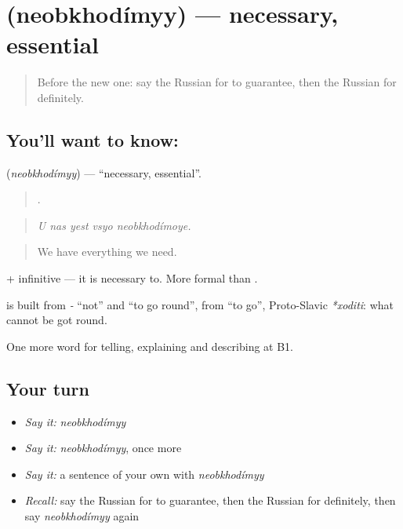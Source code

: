 \section[\texorpdfstring{\ru{необходимый} (neobkhodímyy)}{необходимый (neobkhodímyy)}]{ (neobkhodímyy) — necessary, essential}

\label{lesson:RU-C375-neobkhodimyy}



\begin{quote}
Before the new one: say the Russian for to guarantee, then the Russian for definitely.
\end{quote}

\subsection*{You'll want to know: }
\textbf{} (\emph{neobkhodímyy}) — \textquotedblleft{}necessary, essential\textquotedblright{}.

\begin{quote}
    .
\end{quote}

\begin{quote}
\emph{U nas yest vsyo neobkhodímoye.}
\end{quote}

\begin{quote}
We have everything we need.
\end{quote}

\emph{} + infinitive — it is necessary to. More formal than \emph{}.

\begin{cousinweb}
\textbf{} is built from \emph{-} \textquotedblleft{}not\textquotedblright{} and \emph{} \textquotedblleft{}to go round\textquotedblright{}, from \emph{} \textquotedblleft{}to go\textquotedblright{}, Proto-Slavic \emph{*xoditi}: what cannot be got round.
\end{cousinweb}

\begin{grammarlens}[title={What you've built}]
One more word for telling, explaining and describing at B1.
\end{grammarlens}

\subsection*{Your turn}
\begin{itemize}
\raggedright
  \item \emph{Say it:} \emph{neobkhodímyy}
  \item \emph{Say it:} \emph{neobkhodímyy}, once more
  \item \emph{Say it:} a sentence of your own with \emph{neobkhodímyy}
  \item \emph{Recall:} say the Russian for to guarantee, then the Russian for definitely, then say \emph{neobkhodímyy} again
\end{itemize}

